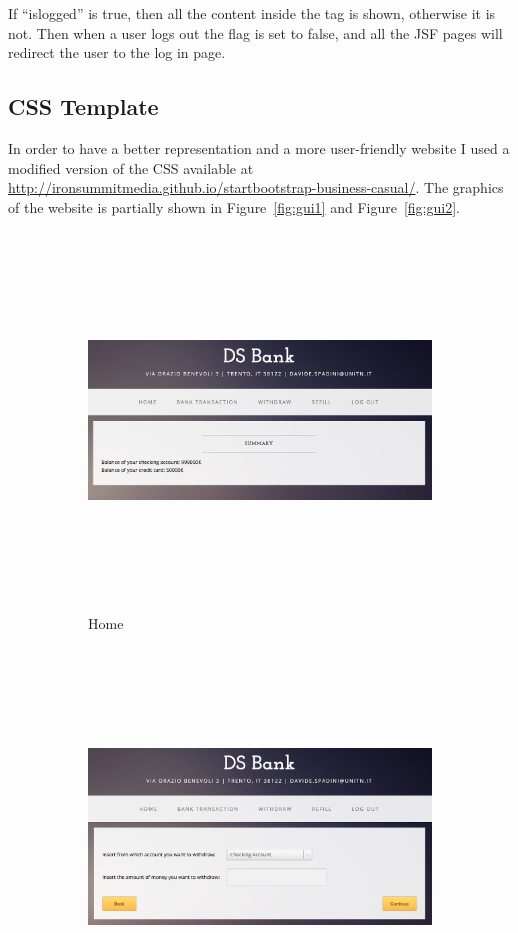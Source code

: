 \documentclass[a4paper]{article}
\begin{document}
\noindent
If ``islogged'' is true, then all the content inside the tag is shown, otherwise it is not. 
Then when a user logs out the flag is set to false, and all the JSF pages will redirect the user to the log in page.

\subsection{CSS Template}
\label{subsec:css}
In order to have a better representation and a more user-friendly website I used a modified version of the CSS available at \url{http://ironsummitmedia.github.io/startbootstrap-business-casual/}. The graphics of the website is partially shown in Figure~\ref{fig:gui1} and Figure~\ref{fig:gui2}.


\begin{figure}[h]
  \begin{subfigure}{0.5\textwidth}
    \includegraphics[keepaspectratio=true, width=0.9\linewidth, height=10cm]{home}
    \caption{Home}
    \label{fig:home}
  \end{subfigure}
  \begin{subfigure}{0.5\textwidth}
    \includegraphics[keepaspectratio=true, width=0.9\linewidth, height=10cm]{refill} 

\end{subfigure}
\end{figure}
\end{document}
